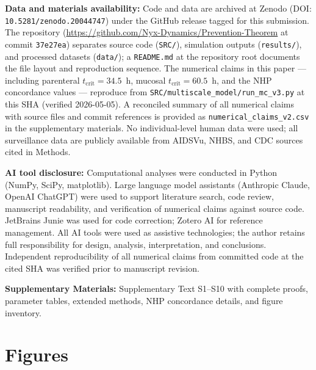 \documentclass[11pt]{article}
\theoremstyle{definition}
\theoremstyle{remark}
\newcommand{\tcrit}{t_{\text{crit}}}
\begin{document}
\textbf{Data and materials availability:} Code and data are archived at Zenodo (DOI: \texttt{10.5281/zenodo.20044747}) under the GitHub release tagged for this submission. The repository (\url{https://github.com/Nyx-Dynamics/Prevention-Theorem} at commit \texttt{37e27ea}) separates source code (\texttt{SRC/}), simulation outputs (\texttt{results/}), and processed datasets (\texttt{data/}); a \texttt{README.md} at the repository root documents the file layout and reproduction sequence. The numerical claims in this paper --- including parenteral $\tcrit = 34.5$~h, mucosal $\tcrit = 60.5$~h, and the NHP concordance values --- reproduce from \texttt{SRC/multiscale\_model/run\_mc\_v3.py} at this SHA (verified 2026-05-05). A reconciled summary of all numerical claims with source files and commit references is provided as \texttt{numerical\_claims\_v2.csv} in the supplementary materials. No individual-level human data were used; all surveillance data are publicly available from AIDSVu, NHBS, and CDC sources cited in Methods.

\textbf{AI tool disclosure:} Computational analyses were conducted in Python (NumPy, SciPy, matplotlib). Large language model assistants (Anthropic Claude, OpenAI ChatGPT) were used to support literature search, code review, manuscript readability, and verification of numerical claims against source code. JetBrains Junie was used for code correction; Zotero AI for reference management. All AI tools were used as assistive technologies; the author retains full responsibility for design, analysis, interpretation, and conclusions. Independent reproducibility of all numerical claims from committed code at the cited SHA was verified prior to manuscript revision.

\textbf{Supplementary Materials:} Supplementary Text S1--S10 with complete proofs, parameter tables, extended methods, NHP concordance details, and figure inventory.

\clearpage
\section*{Figures}
\end{document}
